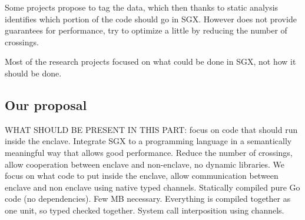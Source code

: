 Some projects\cite{DBLP:conf/usenix/LindPMOAKRGEKFP17} propose to tag the data, which then thanks to static analysis identifies which portion of the code should go in SGX.
However does not provide guarantees for performance, try to optimize a little by reducing the number of crossings.

Most of the research projects focused on what could be done in SGX, not how it should be done.

\subsection{Our proposal}

WHAT SHOULD BE PRESENT IN THIS PART: focus on code that should run inside the enclave.
Integrate SGX to a programming language in a semantically meaningful way that allows good performance.
Reduce the number of crossings, allow cooperation between enclave and non-enclave, no dynamic libraries.
We focus on what code to put inside the enclave, allow communication between enclave and non enclave using native typed channels.
Statically compiled pure Go code (no dependencies).
Few MB necessary.
Everything is compiled together as one unit, so typed checked together.
System call interposition using channels.
